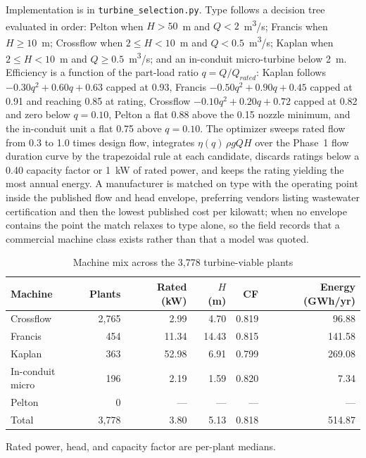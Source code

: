 \documentclass[12pt,letterpaper]{report}
\begin{document}
Implementation is in \texttt{turbine\_selection.py}. Type follows a decision tree
evaluated in order: Pelton when $H > 50$~m and
$Q < 2$~m\textsuperscript{3}/s; Francis when $H \geq 10$~m; Crossflow when
$2 \leq H < 10$~m and $Q < 0.5$~m\textsuperscript{3}/s; Kaplan when
$2 \leq H < 10$~m and $Q \geq 0.5$~m\textsuperscript{3}/s; and an in-conduit
micro-turbine below 2~m. Efficiency is a function of the part-load ratio
$q = Q/Q_{rated}$: Kaplan follows $-0.30q^2 + 0.60q + 0.63$ capped at 0.93,
Francis $-0.50q^2 + 0.90q + 0.45$ capped at 0.91 and reaching 0.85 at rating,
Crossflow $-0.10q^2 + 0.20q + 0.72$ capped at 0.82 and zero below $q = 0.10$,
Pelton a flat 0.88 above the 0.15 nozzle minimum, and the in-conduit unit a flat
0.75 above $q = 0.10$. The optimizer sweeps rated flow from 0.3 to 1.0 times
design flow, integrates $\eta(q)\,\rho g Q H$ over the Phase~1 flow duration
curve by the trapezoidal rule at each candidate, discards ratings below a 0.40
capacity factor or 1~kW of rated power, and keeps the rating yielding the most
annual energy. A manufacturer is matched on type with the operating point inside
the published flow and head envelope, preferring vendors listing wastewater
certification and then the lowest published cost per kilowatt; when no envelope
contains the point the match relaxes to type alone, so the field records that a
commercial machine class exists rather than that a model was quoted.

\begin{table}[htbp]
\centering
\caption{Machine mix across the 3,778 turbine-viable plants}
\label{tab:turbine_mix}
\small
\begin{tabular}{@{}lrrrrr@{}}
\toprule
Machine & Plants & Rated (kW) & $H$ (m) & CF & Energy (GWh/yr) \\
\midrule
Crossflow        & 2{,}765 & 2.99  & 4.70  & 0.819 & 96.88  \\
Francis          & 454     & 11.34 & 14.43 & 0.815 & 141.58 \\
Kaplan           & 363     & 52.98 & 6.91  & 0.799 & 269.08 \\
In-conduit micro & 196     & 2.19  & 1.59  & 0.820 & 7.34   \\
Pelton           & 0       & ---   & ---   & ---   & ---    \\
\midrule
Total            & 3{,}778 & 3.80  & 5.13  & 0.818 & 514.87 \\
\bottomrule
\end{tabular}

\vspace{0.4em}
{\footnotesize Rated power, head, and capacity factor are per-plant medians.}
\end{table}
\end{document}
